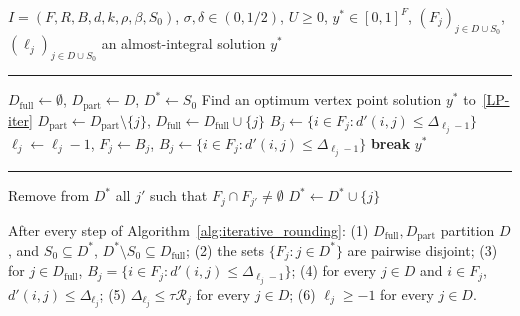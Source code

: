 \documentclass[a4paper,11pt]{article}
\begin{document}
\begin{algorithm}[h]
\caption{Colorful iterative rounding} \label{alg:iterative_rounding}
\begin{algorithmic}
    \Require $I = (F, R, B, d, k, \rho, \beta, S_0)$, $\sigma, \delta \in (0, 1/2)$, $U \ge 0$, $y^* \in [0,1]^F$, $(F_j)_{j \in D \cup S_0}$, $(\ell_j)_{j \in D \cup S_0}$
    \Ensure an almost-integral solution $y^*$
\end{algorithmic}
\noindent\rule{\linewidth}{0.4pt}
\begin{algorithmic}[1]
    \State $D_\text{full} \gets \emptyset$, $D_\text{part} \gets D$, $D^* \gets S_0$
        \State Find an optimum vertex point solution $y^*$ to~\eqref{LP-iter}
            \State $D_\text{part} \gets D_\text{part} \setminus \{j\}$, $D_\text{full} \gets D_\text{full} \cup \{j\}$
            \State $B_j \gets \{i \in F_j : d'(i,j) \le \Delta_{\ell_j-1}\}$
            \State {}
            \State $\ell_j \gets \ell_j - 1$, $F_j \gets B_j$, $B_j \gets \{i \in F_j : d'(i,j) \le \Delta_{\ell_j-1}\}$
            \State {}
        \Else
            \State \textbf{break}
        \EndIf
    \EndWhile
    \State \Return $y^*$
\end{algorithmic}
\noindent\rule{\linewidth}{0.4pt}
\begin{algorithmic}[1]
            \State Remove from $D^*$ all $j'$ such that $F_j \cap F_{j'} \neq \emptyset$
            \State $D^* \gets D^* \cup \{j\}$
        \EndIf
    \EndFunction
\end{algorithmic}
\end{algorithm}

\begin{claim}
\label{claim:invariants}
After every step of Algorithm~\ref{alg:iterative_rounding}: (1)
$D_\text{full},D_\text{part}$ partition $D$, and $S_0\subseteq D^*$,
$D^*\setminus S_0\subseteq D_\text{full}$; (2) the sets $\{F_j : j\in
D^*\}$ are pairwise disjoint; (3) for $j\in D_\text{full}$, $B_j=\{i\in
F_j : d'(i,j)\le\Delta_{\ell_j-1}\}$; (4) for every $j\in D$ and $i\in
F_j$, $d'(i,j)\le\Delta_{\ell_j}$; (5) $\Delta_{\ell_j}\le\tau \mathcal{R}_j$ for
every $j\in D$; (6) $\ell_j\ge -1$ for every $j\in D$.
\end{claim}
\end{document}
